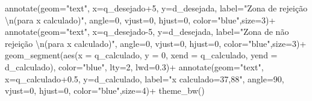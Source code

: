\documentclass[
]{book}
\newenvironment{Shaded}{\begin{snugshade}}{\end{snugshade}}
\newcommand{\AttributeTok}[1]{\textcolor[rgb]{0.77,0.63,0.00}{#1}}
\newcommand{\DecValTok}[1]{\textcolor[rgb]{0.00,0.00,0.81}{#1}}
\newcommand{\FloatTok}[1]{\textcolor[rgb]{0.00,0.00,0.81}{#1}}
\newcommand{\FunctionTok}[1]{\textcolor[rgb]{0.00,0.00,0.00}{#1}}
\newcommand{\NormalTok}[1]{#1}
\newcommand{\SpecialCharTok}[1]{\textcolor[rgb]{0.00,0.00,0.00}{#1}}
\newcommand{\StringTok}[1]{\textcolor[rgb]{0.31,0.60,0.02}{#1}}
\begin{document}
\begin{Shaded}
\begin{Highlighting}[]
 \FunctionTok{annotate}\NormalTok{(}\AttributeTok{geom=}\StringTok{"text"}\NormalTok{, }\AttributeTok{x=}\NormalTok{q\_desejado}\SpecialCharTok{+}\DecValTok{5}\NormalTok{, }\AttributeTok{y=}\NormalTok{d\_desejada, }\AttributeTok{label=}\StringTok{"Zona de rejeição }\SpecialCharTok{\textbackslash{}n}\StringTok{(para x calculado)"}\NormalTok{, }\AttributeTok{angle=}\DecValTok{0}\NormalTok{, }\AttributeTok{vjust=}\DecValTok{0}\NormalTok{, }\AttributeTok{hjust=}\DecValTok{0}\NormalTok{, }\AttributeTok{color=}\StringTok{"blue"}\NormalTok{,}\AttributeTok{size=}\DecValTok{3}\NormalTok{)}\SpecialCharTok{+}
  \FunctionTok{annotate}\NormalTok{(}\AttributeTok{geom=}\StringTok{"text"}\NormalTok{, }\AttributeTok{x=}\NormalTok{q\_desejado}\DecValTok{{-}5}\NormalTok{, }\AttributeTok{y=}\NormalTok{d\_desejada, }\AttributeTok{label=}\StringTok{"Zona de não rejeição  }\SpecialCharTok{\textbackslash{}n}\StringTok{(para x calculado)"}\NormalTok{, }\AttributeTok{angle=}\DecValTok{0}\NormalTok{, }\AttributeTok{vjust=}\DecValTok{0}\NormalTok{, }\AttributeTok{hjust=}\DecValTok{0}\NormalTok{, }\AttributeTok{color=}\StringTok{"blue"}\NormalTok{,}\AttributeTok{size=}\DecValTok{3}\NormalTok{)}\SpecialCharTok{+}
   \FunctionTok{geom\_segment}\NormalTok{(}\FunctionTok{aes}\NormalTok{(}\AttributeTok{x =}\NormalTok{ q\_calculado, }\AttributeTok{y =} \DecValTok{0}\NormalTok{, }\AttributeTok{xend =}\NormalTok{ q\_calculado, }\AttributeTok{yend =}\NormalTok{ d\_calculado), }\AttributeTok{color=}\StringTok{"blue"}\NormalTok{, }\AttributeTok{lty=}\DecValTok{2}\NormalTok{, }\AttributeTok{lwd=}\FloatTok{0.3}\NormalTok{)}\SpecialCharTok{+}
  \FunctionTok{annotate}\NormalTok{(}\AttributeTok{geom=}\StringTok{"text"}\NormalTok{, }\AttributeTok{x=}\NormalTok{q\_calculado}\FloatTok{+0.5}\NormalTok{, }\AttributeTok{y=}\NormalTok{d\_calculado, }\AttributeTok{label=}\StringTok{"x calculado=37,88"}\NormalTok{, }\AttributeTok{angle=}\DecValTok{90}\NormalTok{, }\AttributeTok{vjust=}\DecValTok{0}\NormalTok{, }\AttributeTok{hjust=}\DecValTok{0}\NormalTok{, }\AttributeTok{color=}\StringTok{"blue"}\NormalTok{,}\AttributeTok{size=}\DecValTok{4}\NormalTok{)}\SpecialCharTok{+}
  \FunctionTok{theme\_bw}\NormalTok{()}
\end{Highlighting}
\end{Shaded}
\end{document}
